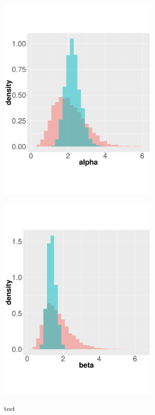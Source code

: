   \begin{figure}%
  \begin{minipage}[!hp]{0.45\linewidth}
  \centering
    \includegraphics [width=0.70\textwidth, angle=0]{figs/hist_alpha.pdf}
    \vspace{-0 in}
     \label{fig:dist_alpha1}
  \end{minipage}
  \begin{minipage}[!hp]{0.45\linewidth}
  \centering
    \includegraphics [width=0.70\textwidth, angle=0]{figs/hist_beta.pdf}
    \vspace{-0 in}
     \label{fig:hist_beta}
  \end{minipage}
    \caption{test}
  \end{figure}
  

